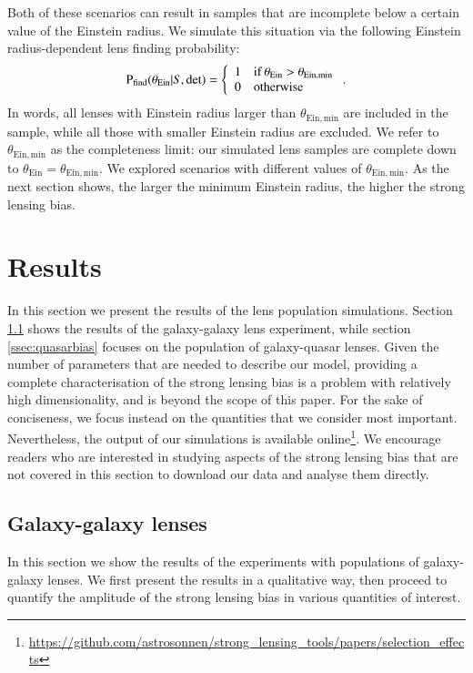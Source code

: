 \documentclass{aa}
\def\tein{\theta_{\mathrm{Ein}}}
\def\teinmin{\theta_{\mathrm{Ein,min}}}
\def\pfind{{\rm P}_\mathrm{find}}
\begin{document}
Both of these scenarios can result in samples that are incomplete below a certain value of the Einstein radius. 
We simulate this situation via the following Einstein radius-dependent lens finding probability:
\begin{equation}
\pfind(\tein|S,\mathrm{det}) = \left\{\begin{array}{ll} 1 & \rm{if}\,\tein > \teinmin \\
0 & \rm{otherwise}\end{array}\right. .
\end{equation}
In words, all lenses with Einstein radius larger than $\theta_{\mathrm{Ein,min}}$ are included in the sample, while all those with smaller Einstein radius are excluded.
We refer to $\teinmin$ as the completeness limit: our simulated lens samples are complete down to $\tein=\teinmin$.
We explored scenarios with different values of $\teinmin$.
As the next section shows, the larger the minimum Einstein radius, the higher the strong lensing bias.


\section{Results}\label{sect:results}

In this section we present the results of the lens population simulations. 
Section \ref{ssec:galbias} shows the results of the galaxy-galaxy lens experiment, while section \ref{ssec:quasarbias} focuses on the population of galaxy-quasar lenses.
Given the number of parameters that are needed to describe our model, providing a complete characterisation of the strong lensing bias is a problem with relatively high dimensionality, and is beyond the scope of this paper.
For the sake of conciseness, we focus instead on the quantities that we consider most important.
Nevertheless, the output of our simulations is available online\footnote{\url{https://github.com/astrosonnen/strong_lensing_tools/papers/selection_effects}}. We encourage readers who are interested in studying aspects of the strong lensing bias that are not covered in this section to download our data and analyse them directly.

\subsection{Galaxy-galaxy lenses}\label{ssec:galbias}

In this section we show the results of the experiments with populations of galaxy-galaxy lenses.
We first present the results in a qualitative way, then proceed to quantify the amplitude of the strong lensing bias in various quantities of interest.
\end{document}
